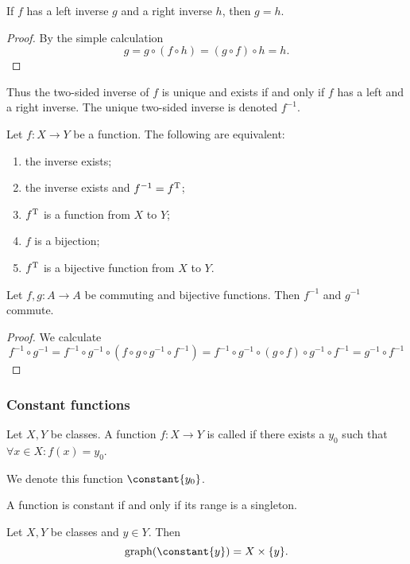 \begin{lemma} \label{leftRightInverse}
If $f$ has a left inverse $g$ and a right inverse $h$, then $g=h$.
\end{lemma}
\begin{proof}
By the simple calculation
\[ g = g\circ (f\circ h) = (g\circ f) \circ h = h. \]
\end{proof}
Thus the two-sided inverse of $f$ is unique and exists \textup{if and only if} $f$ has a left and a right inverse. The unique two-sided inverse is denoted $f^{-1}$.

\begin{lemma} \label{bijectionInverse}
Let $f:X\to Y$ be a function. The following are equivalent:
\begin{enumerate} 
\item the inverse exists;
\item the inverse exists and $f^{-1} = f^{\mathrm{T}}$;
\item $f^{\mathrm{T}}$ is a function from $X$ to $Y$;
\item $f$ is a bijection;
\item $f^{\mathrm{T}}$ is a bijective function from $X$ to $Y$.
\end{enumerate}
\end{lemma}

\begin{lemma} \label{commutationInverse}
Let $f, g:A\to A$ be commuting and bijective functions. Then $f^{-1}$ and $g^{-1}$ commute.
\end{lemma}
\begin{proof}
We calculate
\[ f^{-1}\circ g^{-1} = f^{-1}\circ g^{-1}\circ (f\circ g \circ g^{-1} \circ f^{-1}) = f^{-1}\circ g^{-1}\circ (g\circ f) \circ g^{-1} \circ f^{-1} = g^{-1} \circ f^{-1} \]
\end{proof}

\subsubsection{Constant functions}
\begin{definition}
Let $X,Y$ be classes. A function $f:X\to Y$ is called  if there exists a $y_0$ such that $\forall x\in X: f(x) = y_0$.

We denote this function $\constant{y_0}$.
\end{definition}

A function is constant if and only if its range is a singleton.

\begin{lemma}
Let $X,Y$ be classes and $y\in Y$. Then
\[ \graph(\constant{y}) = X\times \{y\}. \]
\end{lemma}

